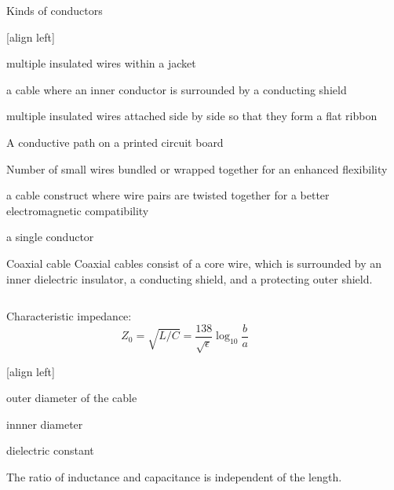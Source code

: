 \documentclass{beamer}
\begin{document}
\begin{frame}{Kinds of conductors}
 \begin{description}
  [align left]
  \item[cable] multiple insulated wires within a jacket
  \item[\hyperlink{coaxial}{coaxial cable}] a cable where an inner conductor is surrounded by a conducting shield
  \item[flat cable] multiple insulated wires attached side by side so that they form a flat ribbon
  \item[PCB trace] A conductive path on a printed circuit board
  \item[\hyperlink{fatique}{stranded wire}] Number of small wires bundled or wrapped together for an enhanced flexibility
  \item[twisted pair] a cable construct where wire pairs are twisted together for a better electromagnetic compatibility
  \item[wire] a single conductor
 \end{description}
\end{frame}

\begin{frame}[label=coaxial]{Coaxial cable}
Coaxial cables consist of a core wire, which is surrounded by an inner dielectric insulator, a conducting shield, and a protecting outer shield.
\bigskip
\begin{columns}
  \begin{column}{0.48\textwidth}\small
    Characteristic impedance:~\cite[p. 1116]{horowitz2015art}
    \begin{equation*}
      Z_0 = \sqrt{L/C} = \frac{138}{\sqrt{\epsilon}}\log_{10}{\frac{b}{a}}
    \end{equation*}
    \begin{description}
      [align left]
      \item[$a$] outer diameter of the cable
      \item[$b$] innner diameter
      \item[$\epsilon$] dielectric constant
    \end{description}
    The ratio of inductance and capacitance is independent of the length.
  \end{column}
  \begin{column}{0.48\textwidth}
  \end{column}
\end{columns}
\end{frame}
\end{document}

